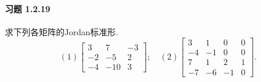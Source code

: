 \documentclass[12pt, a4paper, oneside, fontset=none]{ctexart}
\begin{document}
\paragraph*{习题 1.2.19} 求下列各矩阵的Jordan标准形.
\[
    (1) \begin{bmatrix}
        3  & 7   & -3 \\
        -2 & -5  & 2  \\
        -4 & -10 & 3
    \end{bmatrix}; \quad
    (2) \begin{bmatrix}
        3  & 1  & 0  & 0 \\
        -4 & -1 & 0  & 0 \\
        7  & 1  & 2  & 1 \\
        -7 & -6 & -1 & 0
    \end{bmatrix}.
\]
\end{document}

